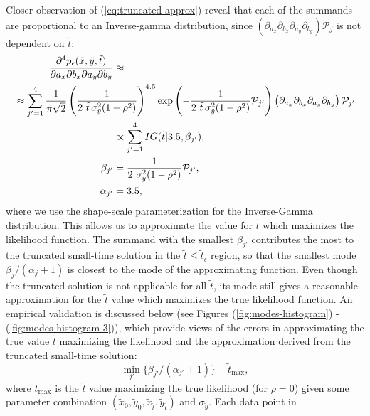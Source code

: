 Closer observation of (\ref{eq:truncated-approx}) reveal that each of
the summands are proportional to an Inverse-gamma distribution, since
$\left(\partial_{a_x}\partial_{b_x} \partial_{a_y}\partial_{b_y}
\right)\mathcal{P}_j$ is not dependent on $\tilde{t}$:
\begin{align*}
  \frac{\partial^4 p_\epsilon(\tilde{x}, \tilde{y}, \tilde{t})}{\partial a_x
  \partial b_x \partial a_y \partial b_y} &\approx \\
   \MoveEqLeft[10] \approx \sum_{j' = 1}^{4} \frac{1}{\pi\sqrt{2}} \left(\frac{1}{2\,\,\tilde{t}\, \sigma_{\tilde{y}}^2 (1-\rho^2)} \right)^{4.5}
                                            \exp\left( -\frac{1}{2\,\,\tilde{t}\, \sigma_{\tilde{y}}^2 (1-\rho^2)} \mathcal{P}_{j'}\right)
  \left(\partial_{a_x}\partial_{b_x} \partial_{a_y}\partial_{b_y} \right)\mathcal{P}_{j'} \\
                                          &\propto \sum_{j' = 1}^{4} IG(\tilde{t} | 3.5, \beta_{j'}), \\ 
 \beta_{j'} &= \frac{1}{2\,\, \sigma_{\tilde{y}}^2 (1-\rho^2)} \mathcal{P}_{j'}, \\
  \alpha_{j'} &= 3.5,
\end{align*}
where we use the shape-scale parameterization for the Inverse-Gamma
distribution. This allows us to approximate the value for $\tilde{t}$
which maximizes the likelihood function. The summand with the smallest
$\beta_{j'}$ contributes the most to the truncated small-time solution
in the $\tilde{t} \leq \tilde{t}_\epsilon$ region, so that the
smallest mode $\beta_j/(\alpha_j+1)$ is closest to the mode of the
approximating function. Even though the truncated solution is not
applicable for all $\tilde{t}$, its mode still gives a reasonable
approximation for the $\tilde{t}$ value which maximizes the true
likelihood function. An empirical validation is discussed below (see
Figures (\ref{fig:modes-histogram}) - (\ref{fig:modes-histogram-3})),
which provide views of the errors in approximating the true value $\tilde{t}$
maximizing the likelihood and the approximation derived from the
truncated small-time solution:
\[ \min_{j'} \{ \beta_{j'}/(\alpha_{j'}+1) \} - \tilde{t}_{\max},
\] where $\tilde{t}_{\max}$ is the $\tilde{t}$ value maximizing the
true likelihood (for $\rho=0$) given some parameter combination
$(\tilde{x}_0, \tilde{y}_0, \tilde{x}_{\tilde{t}},
\tilde{y}_{\tilde{t}})$ and $\sigma_{\tilde{y}}$. Each data point in

